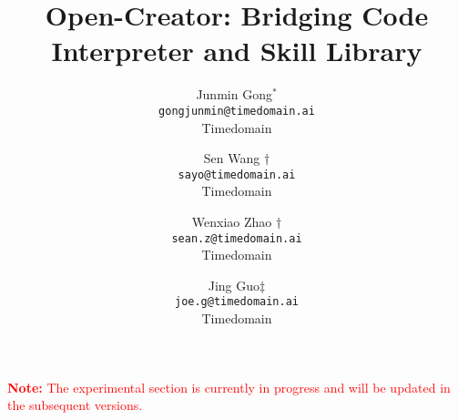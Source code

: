 \documentclass{article}
\title{Open-Creator: Bridging Code Interpreter and Skill Library}
\author{
Junmin Gong\(^{*}\) \\
\texttt{gongjunmin@timedomain.ai} \\
Timedomain \\
\and
Sen Wang \(\dagger\) \\
\texttt{sayo@timedomain.ai} \\
Timedomain \\
\and
Wenxiao Zhao \(\dagger\) \\
\texttt{sean.z@timedomain.ai} \\
Timedomain \\
\and
Jing Guo\(\ddagger\) \\
\texttt{joe.g@timedomain.ai} \\
Timedomain \\
}
\begin{document}
\textcolor{red}{\textbf{Note:} The experimental section is currently in progress and will be updated in the subsequent versions.}
\maketitle






% 
% 
% 

\newpage

  
\end{document}
